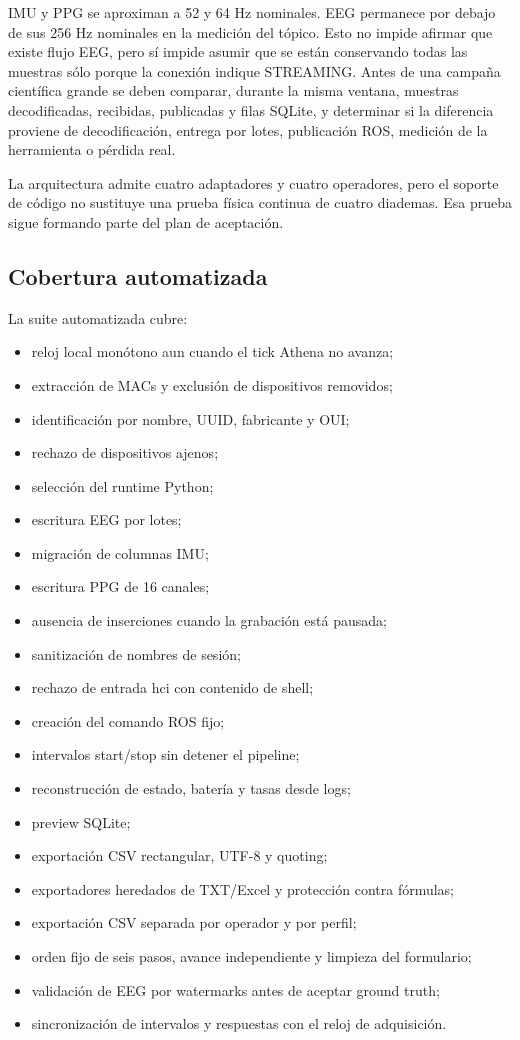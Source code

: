 \documentclass[11pt,a4paper]{article}
\begin{document}
IMU y PPG se aproximan a 52 y 64 Hz nominales. EEG permanece por debajo de sus 256 Hz nominales en la medición del tópico. Esto no impide afirmar que existe flujo EEG, pero sí impide asumir que se están conservando todas las muestras sólo porque la conexión indique {\ttfamily\small STREAMING}. Antes de una campaña científica grande se deben comparar, durante la misma ventana, muestras decodificadas, recibidas, publicadas y filas SQLite, y determinar si la diferencia proviene de decodificación, entrega por lotes, publicación ROS, medición de la herramienta o pérdida real.

La arquitectura admite cuatro adaptadores y cuatro operadores, pero el soporte de código no sustituye una prueba física continua de cuatro diademas. Esa prueba sigue formando parte del plan de aceptación.

\subsection{Cobertura automatizada}

La suite automatizada cubre:

\begin{itemize}
\item reloj local monótono aun cuando el tick Athena no avanza;
\item extracción de MACs y exclusión de dispositivos removidos;
\item identificación por nombre, UUID, fabricante y OUI;
\item rechazo de dispositivos ajenos;
\item selección del runtime Python;
\item escritura EEG por lotes;
\item migración de columnas IMU;
\item escritura PPG de 16 canales;
\item ausencia de inserciones cuando la grabación está pausada;
\item sanitización de nombres de sesión;
\item rechazo de entrada {\ttfamily\small hci} con contenido de shell;
\item creación del comando ROS fijo;
\item intervalos start/stop sin detener el pipeline;
\item reconstrucción de estado, batería y tasas desde logs;
\item preview SQLite;
\item exportación CSV rectangular, UTF-8 y quoting;
\item exportadores heredados de TXT/Excel y protección contra fórmulas;
\item exportación CSV separada por operador y por perfil;
\item orden fijo de seis pasos, avance independiente y limpieza del formulario;
\item validación de EEG por watermarks antes de aceptar ground truth;
\item sincronización de intervalos y respuestas con el reloj de adquisición.
\end{itemize}
\end{document}

